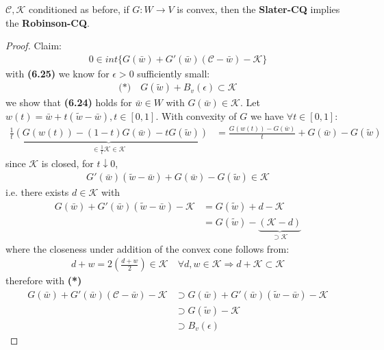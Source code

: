 \begin{theorem}
	$\mathcal{C}, \mathcal{K}$ conditioned as before, if $G:W \rightarrow V $ is convex, then the \textbf{Slater-CQ} implies the \textbf{Robinson-CQ}.
\end{theorem}
\begin{proof}
Claim:
\begin{align*}
	0 \in int\{ G(\bar{w}) + G'(\bar{w}) (\mathcal{C} - \bar{w}) - \mathcal{K}\}
\end{align*}
	with \textbf{(6.25)} we know for $\epsilon > 0$ sufficiently small:
	\begin{align*}
	    \textbf{(*)} \quad
		G(\tilde{w}) + B_v(\epsilon) \subset \mathcal{K}
	\end{align*}
	we show that \textbf{(6.24)} holds for $\bar{w} \in W$ with $G(\bar{w}) \in \mathcal{K}$. Let $w(t) = \bar{w} + t(\tilde{w} - \bar{w}), t \in [0, 1]$. With convexity of $G$ we have $\forall t \in [0, 1]:$
	\begin{align*}
		\underbrace{\frac{1}{t}(G(w(t)) - (1 - t)G(\bar{w}) - tG(\tilde{w}))}_{\in \frac{1}{t} \mathcal{K} \in \mathcal{K}}
		&= \frac{G(w(t)) - G(\bar{w})}{t} + G(\bar{w}) - G(\tilde{w})
	\end{align*}
	since $\mathcal{K}$ is closed, for $t \downarrow 0$, 
	\begin{align*}
		G'(\bar{w}) (\tilde{w} - \bar{w}) + G(\bar{w}) - G(\tilde{w}) \in \mathcal{K}
	\end{align*}
	i.e. there exists $d \in \mathcal{K}$ with 
	\begin{align*}
		G(\bar{w}) + G'(\bar{w})(\tilde{w} - \bar{w}) - \mathcal{K}
		&= G(\tilde{w}) + d - \mathcal{K} \\
		&= G(\tilde{w}) - \underbrace{ (\mathcal{K} - d) }_{\supset \mathcal{K}}
	\end{align*}
	where the closeness under addition of the convex cone follows from:
	\begin{align*}
		d + w = 2 (\frac{d + w}{2}) \in \mathcal{K} \quad \forall d, w \in \mathcal{K} \Rightarrow d + \mathcal{K} \subset \mathcal{K}
	\end{align*}
	therefore with \textbf{(*)}
	\begin{align*}
		G(\bar{w}) + G'(\bar{w}) (\mathcal{C} - \bar{w}) - \mathcal{K} 
		&\supset G(\bar{w}) + G'(\bar{w})(\tilde{w} - \bar{w}) - \mathcal{K}\\
		&\supset G(\tilde{w}) - \mathcal{K}\\
		&\supset B_v(\epsilon)
	\end{align*}
\end{proof}

